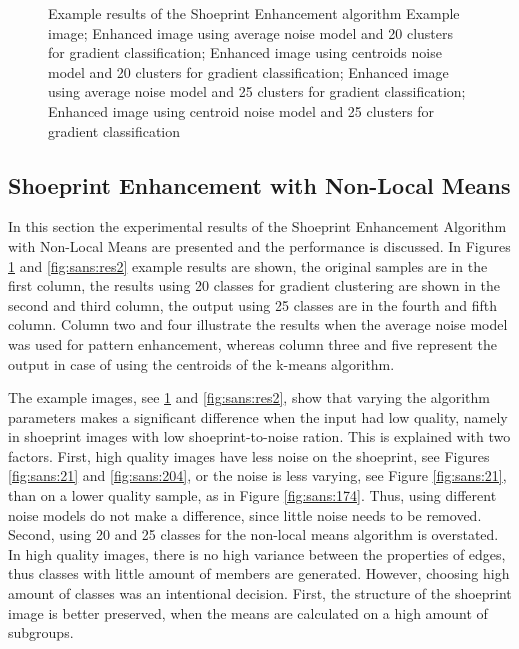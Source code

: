 \documentclass[draft,final]{vutinfth} %
\begin{document}
\begin{figure}[H]
\caption{Example results of the Shoeprint Enhancement algorithm
				 Example image;  Enhanced image using average noise model and 20 clusters for gradient classification;  Enhanced image using centroids noise model and 20 clusters for gradient classification;  Enhanced image using average noise model and 25 clusters for gradient classification;  Enhanced image using centroid noise model and 25 clusters for gradient classification}
\label{fig:sans:res1}

\end{figure}

\subsection{Shoeprint Enhancement with Non-Local Means}
\par
In this section the experimental results of the Shoeprint Enhancement Algorithm with Non-Local Means are presented and the performance is discussed.
In Figures \ref{fig:sans:res1} and \ref{fig:sans:res2} example results are shown, the original samples are in the first column, the results using 20 classes for gradient clustering are shown in the second and third column, the output using 25 classes are in the fourth and fifth column.
Column two and four illustrate the results when the average noise model was used for pattern enhancement, whereas column three and five represent the output in case of using the centroids of the k-means algorithm.
\par
The example images, see  \ref{fig:sans:res1} and \ref{fig:sans:res2}, show that varying the algorithm parameters makes a significant difference when the input had low quality, namely in shoeprint images with low shoeprint-to-noise ration.
This is explained with two factors.
First, high quality images have less noise on the shoeprint, see Figures \ref{fig:sans:21} and \ref{fig:sans:204}, or the noise is less varying, see Figure \ref{fig:sans:21}, than on a lower quality sample, as in Figure \ref{fig:sans:174}.
Thus, using different noise models do not make a difference, since little noise needs to be removed.
Second, using 20 and 25 classes for the non-local means algorithm is overstated.
In high quality images, there is no high variance between the properties of edges, thus classes with little amount of members are generated.
However, choosing high amount of classes was an intentional decision.
First, the structure of the shoeprint image is better preserved, when the means are calculated on a high amount of subgroups.
\end{document}
